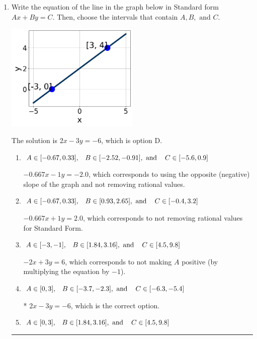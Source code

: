 \documentclass{extbook}[14pt]
\newcommand{\litem}[1]{\item #1

\rule{\textwidth}{0.4pt}}
\begin{document}
\begin{enumerate}\litem{
Write the equation of the line in the graph below in Standard form $Ax+By=C$. Then, choose the intervals that contain $A, B, \text{ and } C$.

\begin{center}
    \includegraphics[width=0.5\textwidth]{../Figures/linearGraphToStandardA.png}
\end{center}


The solution is \( 2x - 3y = -6 \), which is option D.\begin{enumerate}[label=\Alph*.]
\item \( A \in [-0.67, 0.33], \hspace{3mm} B \in [-2.52, -0.91], \text{ and } \hspace{3mm} C \in [-5.6, 0.9] \)

 $-0.667x - 1y = -2.0$, which corresponds to using the opposite (negative) slope of the graph and not removing rational values.
\item \( A \in [-0.67, 0.33], \hspace{3mm} B \in [0.93, 2.65], \text{ and } \hspace{3mm} C \in [-0.4, 3.2] \)

 $-0.667x + 1y = 2.0$, which corresponds to not removing rational values for Standard Form.
\item \( A \in [-3, -1], \hspace{3mm} B \in [1.84, 3.16], \text{ and } \hspace{3mm} C \in [4.5, 9.8] \)

 $-2x + 3y = 6$, which corresponds to not making $A$ positive (by multiplying the equation by $-1$).
\item \( A \in [0, 3], \hspace{3mm} B \in [-3.7, -2.3], \text{ and } \hspace{3mm} C \in [-6.3, -5.4] \)

* $2x - 3y = -6$, which is the correct option.
\item \( A \in [0, 3], \hspace{3mm} B \in [1.84, 3.16], \text{ and } \hspace{3mm} C \in [4.5, 9.8] \)


\end{enumerate}}
\end{enumerate}
\end{document}
